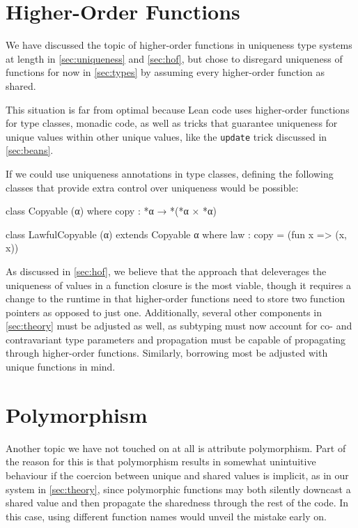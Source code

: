 \section{Higher-Order Functions}
We have discussed the topic of higher-order functions in uniqueness type systems at length in \cref{sec:uniqueness} and \cref{sec:hof}, but chose to disregard uniqueness of functions for now in \cref{sec:types} by assuming every higher-order function as shared. 

This situation is far from optimal because Lean code uses higher-order functions for type classes, monadic code, as well as tricks that guarantee uniqueness for unique values within other unique values, like the \lstinline|update| trick discussed in \cref{sec:beans}. 

If we could use uniqueness annotations in type classes, defining the following classes that provide extra control over uniqueness would be possible:

\begin{code}
class Copyable (α) where
  copy : *α → *(*α × *α)
  
class LawfulCopyable (α) extends Copyable α where
  law : copy = (fun x => (x, x))
\end{code}

As discussed in \cref{sec:hof}, we believe that the approach that deleverages the uniqueness of values in a function closure is the most viable, though it requires a change to the runtime in that higher-order functions need to store two function pointers as opposed to just one. Additionally, several other components in \cref{sec:theory} must be adjusted as well, as subtyping must now account for co- and contravariant type parameters and propagation must be capable of propagating through higher-order functions. Similarly, borrowing most be adjusted with unique functions in mind.

\section{Polymorphism}
Another topic we have not touched on at all is attribute polymorphism. Part of the reason for this is that polymorphism results in somewhat unintuitive behaviour if the coercion between unique and shared values is implicit, as in our system in \cref{sec:theory}, since polymorphic functions may both silently downcast a shared value and then propagate the sharedness through the rest of the code. In this case, using different function names would unveil the mistake early on.

